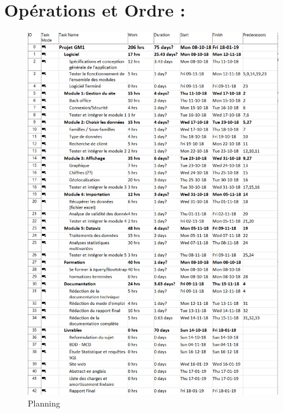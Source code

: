 \section{Opérations et Ordre :}

\begin{figure}[h]
	\begin{center}
		\includegraphics[scale=0.6]{img/planning.png}
		\caption{Planning}
	\end{center}
\end{figure}